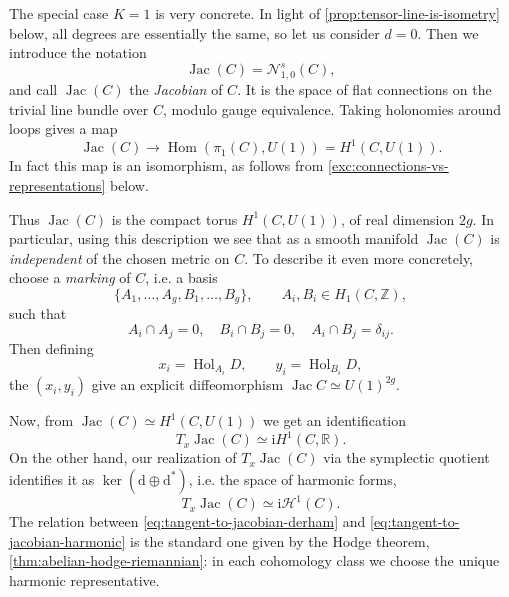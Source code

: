 \documentclass[12pt,letterpaper,reqno]{article}
\numberwithin{equation}{section}
\newcommand{\cN}{\ensuremath{\mathcal N}}
\newcommand{\cH}{\ensuremath{\mathcal H}}
\newcommand{\R}{\ensuremath{\mathbb R}}
\newcommand{\Z}{\ensuremath{\mathbb Z}}
\newcommand{\I}{{\mathrm i}}
\newcommand{\de}{\mathrm{d}}
\newcommand{\ti}[1]{\textit{#1}}
\DeclareMathOperator{\Hom}{Hom}
\DeclareMathOperator{\Jac}{Jac}
\DeclareMathOperator{\Hol}{Hol}
\begin{document}
\begin{example}[Jacobians] \label{exa:jacobians}
The special case $K=1$ is very concrete. In light of 
\autoref{prop:tensor-line-is-isometry} below, all degrees are
essentially the same, so let us consider $d=0$. Then we
introduce the notation
\begin{equation}
 \Jac(C) = \cN^s_{1,0}(C),
\end{equation}
and call $\Jac(C)$ the \ti{Jacobian} of $C$.
It is the space of flat connections on the trivial line
bundle over $C$, modulo gauge equivalence.
Taking holonomies around loops gives a map
\begin{equation}
  \Jac(C) \to \Hom(\pi_1(C), U(1)) = H^1(C, U(1)).
\end{equation}
In fact this map is an isomorphism, as follows from
\autoref{exc:connections-vs-representations} below.

Thus $\Jac(C)$ is the compact torus $H^1(C,U(1))$,
of real dimension $2g$.
In particular, using this description we see that 
as a smooth manifold $\Jac(C)$
is \ti{independent} of the chosen metric on $C$.
To describe it even more concretely, choose a 
\ti{marking} of $C$, i.e. a basis 
\begin{equation}
	\{A_1, \dots, A_g, B_1, \dots, B_g \}, \qquad A_i, B_i \in H_1(C,\Z),
\end{equation}
such that
\begin{equation}
	A_i \cap A_j = 0, \quad B_i \cap B_j = 0, \quad A_i \cap B_j = \delta_{ij}.
\end{equation}
Then defining
\begin{equation}
	x_i = \Hol_{A_i} D, \qquad y_i = \Hol_{B_i} D,
\end{equation}
the $(x_i,y_i)$ give an explicit diffeomorphism $\Jac C \simeq U(1)^{2g}$.

Now, from $\Jac(C) \simeq H^1(C,U(1))$
we get an identification
\begin{equation} \label{eq:tangent-to-jacobian-derham}
 T_x \Jac(C) \simeq \I H^1(C,\R).
\end{equation}
On the other hand, our realization of $T_x \Jac(C)$ via the symplectic quotient
identifies it as $\ker (\de \oplus \de^*)$, i.e. 
the space of harmonic forms,
\begin{equation} \label{eq:tangent-to-jacobian-harmonic}
 T_x \Jac(C) \simeq \I \cH^1(C).
\end{equation}
The relation between \eqref{eq:tangent-to-jacobian-derham}
and \eqref{eq:tangent-to-jacobian-harmonic}
is the standard one given by the Hodge theorem,
\autoref{thm:abelian-hodge-riemannian}:
in each cohomology class we choose the unique 
harmonic representative.


\end{example}
\end{document}
